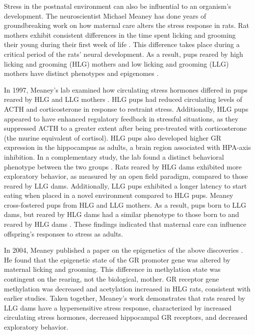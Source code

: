 \documentclass[12pt,twoside]{reedthesis}
\begin{document}
Stress in the postnatal
environment can also be influential to an organism's development. The
neuroscientist Michael Meaney has done years of groundbreaking work on how maternal
care alters the stress response in rats.  Rat mothers exhibit consistent differences in the time spent licking and grooming
their young during their first week of life \citep{meaney_early_1996}. This difference takes place during a critical period
of the rats' neural development. As a result, pups reared by high licking and grooming
(HLG) mothers and low licking and grooming (LLG) mothers have distinct
phenotypes and epigenomes \citep{weaver_epigenetic_2004}.

In 1997, Meaney's lab examined how circulating stress hormones differed in pups
reared by HLG and LLG mothers \citep{liu_maternal_2000}. HLG pups had reduced circulating levels of ACTH and
corticosterone in response to restraint stress. Additionally, HLG pups appeared
to have enhanced regulatory feedback in stressful situations, as they suppressed
ACTH to a greater extent after being pre-treated with corticosterone (the murine
equivalent of cortisol). HLG pups
also developed higher GR expression in the hippocampus as adults, a brain region
associated with HPA-axis inhibition. In a
complementary study, the lab found a distinct behavioral phenotype between the
two groups \citep{caldji_maternal_1998}. Rats reared by HLG dams exhibited more exploratory
behavior, as measured by an open field paradigm, compared to those reared by LLG
dams. Additionally, LLG pups exhibited a longer latency to start eating when
placed in a novel environment compared to HLG pups. Meaney cross-fostered pups from HLG and
LLG mothers. As a result, pups born to LLG dams, but reared by HLG dams had a
similar phenotype to those born to and reared by HLG dams \citep{francis_nongenomic_1999}. These findings
indicated that maternal care can influence offspring's responses to stress as
adults.

In 2004, Meaney
published a paper on the epigenetics of the above discoveries \citep{weaver_epigenetic_2004}. He found that the
epigenetic state of the GR promoter gene was altered by maternal licking and
grooming. This difference in methylation state was contingent on the rearing,
not the biological, mother.  GR receptor gene methylation was decreased and
acetylation increased in HLG rats, consistent with earlier studies. Taken
together, Meaney's work demonstrates that rats reared by LLG dams have a
hypersensitive stress response, characterized by increased circulating stress
hormones, decreased hippocampal GR receptors, and decreased exploratory
behavior.
\end{document}
